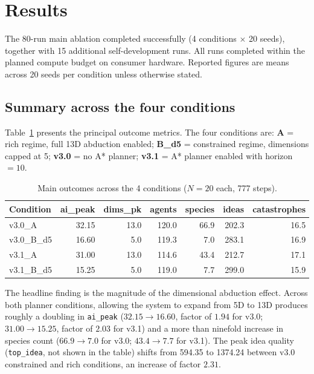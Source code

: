 \documentclass[11pt,a4paper]{article}
\begin{document}
\section{Results}
\label{sec:results}

The 80-run main ablation completed successfully (4 conditions $\times$ 20 seeds),
together with 15 additional self-development runs. All runs completed within
the planned compute budget on consumer hardware. Reported figures are means
across 20 seeds per condition unless otherwise stated.

\subsection{Summary across the four conditions}

Table~\ref{tab:main} presents the principal outcome metrics. The four
conditions are: \textbf{A} = rich regime, full 13D abduction enabled;
\textbf{B\_d5} = constrained regime, dimensions capped at 5;
\textbf{v3.0} = no A* planner; \textbf{v3.1} = A* planner enabled with
horizon~$=10$.

\begin{table}[h]
\centering
\caption{Main outcomes across the 4 conditions ($N=20$ each, 777 steps).}
\label{tab:main}
\small
\begin{tabular}{lrrrrrr}
\toprule
Condition & ai\_peak & dims\_pk & agents & species & ideas & catastrophes \\
\midrule
v3.0\_A     & 32.15 & 13.0 & 120.0 & 66.9 & 202.3 & 16.5 \\
v3.0\_B\_d5 & 16.60 &  5.0 & 119.3 &  7.0 & 283.1 & 16.9 \\
v3.1\_A     & 31.00 & 13.0 & 114.6 & 43.4 & 212.7 & 17.1 \\
v3.1\_B\_d5 & 15.25 &  5.0 & 119.0 &  7.7 & 299.0 & 15.9 \\
\bottomrule
\end{tabular}
\end{table}

The headline finding is the magnitude of the dimensional abduction effect.
Across both planner conditions, allowing the system to expand from 5D
to 13D produces roughly a doubling in \texttt{ai\_peak}
($32.15 \rightarrow 16.60$, factor of $1.94$ for v3.0;
$31.00 \rightarrow 15.25$, factor of $2.03$ for v3.1) and a more than
ninefold increase in species count ($66.9 \rightarrow 7.0$ for v3.0;
$43.4 \rightarrow 7.7$ for v3.1). The peak idea quality
(\texttt{top\_idea}, not shown in the table) shifts from 594.35 to 1374.24
between v3.0 constrained and rich conditions, an increase of factor $2.31$.
\end{document}
